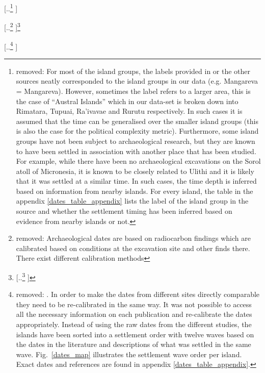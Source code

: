 \documentclass[unnumsec,webpdf,modern,medium]{oup-authoring-template}
\providecommand{\DIFdeltex}[1]{{\protect\color{red} [..\footnote{removed: #1} ]}} %
\providecommand{\DIFdelbegin}{} %
\providecommand{\DIFdelend}{} %
\providecommand{\DIFdel}[1]{\texorpdfstring{\DIFdeltex{#1}}{}} %
\newcommand{\DIFscaledelfig}{0.5}
\newlength{\DIFdelgraphicswidth} %
\newlength{\DIFdelgraphicsheight} %
\newcommand{\DIFdelincludegraphics}[2][]{%
\sbox{\DIFdelgraphicsbox}{\DIFOincludegraphics[#1]{#2}}%
\settoboxwidth{\DIFdelgraphicswidth}{\DIFdelgraphicsbox} %
\settoboxtotalheight{\DIFdelgraphicsheight}{\DIFdelgraphicsbox} %
\scalebox{\DIFscaledelfig}{%
\parbox[b]{\DIFdelgraphicswidth}{\usebox{\DIFdelgraphicsbox}\\[-\baselineskip] \rule{\DIFdelgraphicswidth}{0em}}\llap{\resizebox{\DIFdelgraphicswidth}{\DIFdelgraphicsheight}{%
\setlength{\unitlength}{\DIFdelgraphicswidth}%
\begin{picture}(1,1)%
\thicklines\linethickness{2pt} %
{\color[rgb]{1,0,0}\put(0,0){\framebox(1,1){}}}%
{\color[rgb]{1,0,0}\put(0,0){\line( 1,1){1}}}%
{\color[rgb]{1,0,0}\put(0,1){\line(1,-1){1}}}%
\end{picture}%
}\hspace*{3pt}}} %
} %
\DeclareRobustCommand{\DIFdelbegin}{\DIFOdelbegin \let\includegraphics\DIFdelincludegraphics} %
\DeclareRobustCommand{\DIFdelend}{\DIFOaddend \let\includegraphics\DIFOincludegraphics} %
\begin{document}
\DIFdelbegin \DIFdel{For most of the island groups, the labels provided in \citet{rieth_cochrane_2018} or the other sources neatly corresponded to the island groups in our data (e.g. Mangareva = Mangareva). However, sometimes the label refers to a larger area, this is the case of ``Austral Islands'' which in our data-set is broken down into Rimatara, Tupuai, Ra'ivavae and Rurutu respectively. In such cases it is assumed that the time can be generalised over the smaller island groups (this is also the case for the political complexity metric). Furthermore, some island groups have not been subject to archaeological research, but they are known to have been settled in association with another place that has been studied. For example, while there have been no archaeological excavations on the Sorol atoll of Micronesia, it is known to be closely related to Ulithi \citep[23]{quackenbush1968sonsorol} and it is likely that it was settled at a similar time. In such cases, the time depth is inferred based on information from nearby islands. For every island, the table in the appendix \ref{dates_table_appendix} lists the label of the island group in the source and whether the settlement timing has been inferred based on evidence from nearby islands or not.
}\DIFdelend %

\DIFdelbegin \DIFdel{Archaeological dates are based on radiocarbon findings which are calibrated based on conditions at the excavation site and other finds there. There exist different calibration methods}\footnote{\DIFdel{Radiocarbon calibration is the process by which radiocarbon years are converted into calendar years. Because the ratio of atmospheric $^{14}$C/$^{12}$C, which is a key element in this process, has not been stable historically, different methods exist and these may produce different results.}}%
\addtocounter{footnote}{-1}%
\DIFdel{. In order to make the dates from different sites directly comparable they need to be re-calibrated in the same way. It was not possible to access all the necessary information on each publication and re-calibrate the dates appropriately. Instead of using the raw dates from the different studies, the islands have been sorted into a settlement order with twelve waves based on the dates in the literature and descriptions of what was settled in the same wave.
Fig.~\ref{dates_map} illustrates the settlement wave order per island. Exact dates and references are found in appendix \ref{dates_table_appendix}.
}\DIFdelend %
\end{document}
